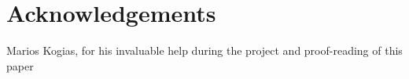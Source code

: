\chapter*{Acknowledgements}

Marios Kogias, for his invaluable help during the project and
proof-reading of this paper
